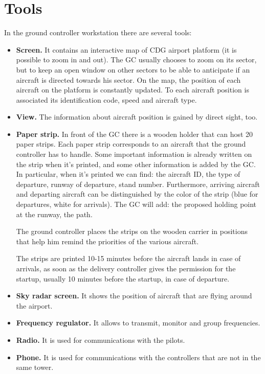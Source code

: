\documentclass{article}
\begin{document}
\section{Tools}
In the ground controller workstation there are several tools:
\begin{itemize}
	\item \textbf{Screen.} It contains an interactive map of CDG airport platform (it is possible to zoom in and out). The GC usually chooses to zoom on its sector, but to keep an open window on other sectors to be able to anticipate if an aircraft is directed towards his sector.	
	On the map, the position of each aircraft on the platform is constantly updated. To each aircraft position is associated its identification code, speed and aircraft type. 
	\item \textbf{View.} The information about aircraft position is gained by direct sight, too.
	\item \textbf{Paper strip.} In front of the GC there is a wooden holder that can host 20 paper strips. Each paper strip corresponds to an aircraft that the ground controller has to handle. Some important information is already written on the strip when it's printed, and some other information is added by the GC.
	In particular, when it's printed we can find: the aircraft ID, the type of departure, runway of departure, stand number. Furthermore, arriving aircraft and departing aircraft can be distinguished by the color of the strip (blue for departures, white for arrivals). 
	The GC will add: the proposed holding point at the runway, the path.
	
	The ground controller places the strips on the wooden carrier in positions that help him remind the priorities of the various aircraft.
	
	The strips are printed 10-15 minutes before the aircraft lands in case of arrivals, as soon as the delivery controller gives the permission for the startup, usually 10 minutes before the startup, in case of departure.
	
	\item\textbf{Sky radar screen.} It shows the position of aircraft that are flying around the airport.
	\item\textbf{Frequency regulator.} It allows to transmit, monitor and group frequencies.
	\item\textbf{Radio.} It is used for communications with the pilots.
	\item \textbf{Phone.} It is used for communications with the controllers that are not in the same tower.
	

\end{itemize}
\end{document}
